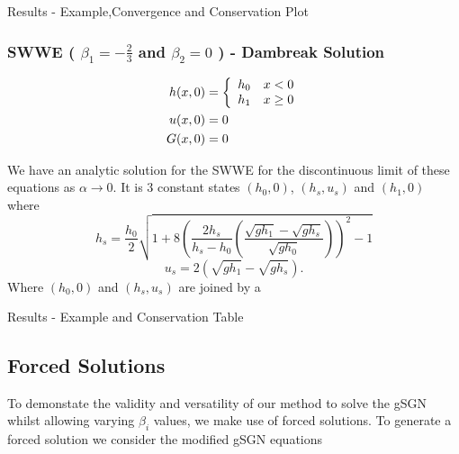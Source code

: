\documentclass[10pt]{article}
\begin{document}

Results - Example,Convergence and Conservation Plot

\subsubsection{SWWE ( $\beta_1= -\frac{2}{3}$ and $ \beta_2 =0$ ) - Dambreak Solution }
\begin{align}
h(x,0) & = \left\lbrace \begin{array}{c c}
h_0 & x < 0\\
h_1 & x \ge 0
\end{array} \right.  \\
u(x,0) &= 0 \\
G(x,0) &= 0
\end{align}

We have an analytic solution for the SWWE for the discontinuous limit of these equations as $\alpha \rightarrow 0$. It is 3 constant states $(h_0,0)$, $(h_s,u_s)$ and $(h_1,0)$ where
\begin{equation}
h_s = \dfrac{h_0}{2}  \sqrt{1 + 8 \left( \dfrac{2 h_s}{h_s - h_0} \left(\dfrac{\sqrt{gh_1} - \sqrt{gh_s}}{\sqrt{gh_0}}\right)\right)^2 - 1}
\end{equation}
\begin{equation}
u_s = 2\left(\sqrt{gh_1} - \sqrt{gh_s} \right).
\end{equation}
Where $(h_0,0)$ and $(h_s,u_s)$ are joined by a 


Results - Example and Conservation Table


\subsection{Forced Solutions}
To demonstate the validity and versatility of our method to solve the gSGN whilst allowing varying $\beta_i$ values, we make use of forced solutions. To generate a forced solution we consider the modified gSGN equations 
\end{document}
